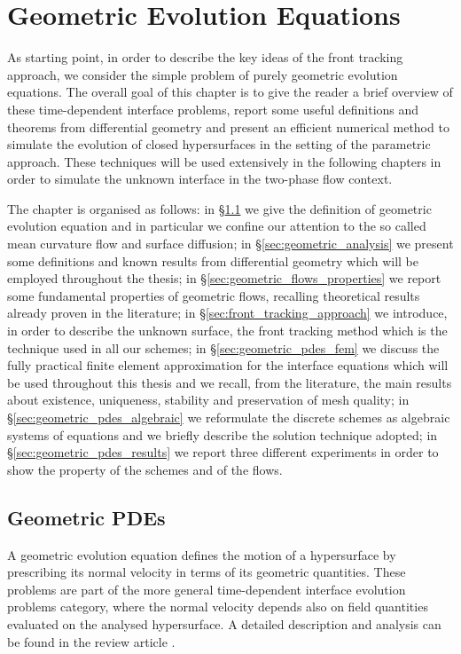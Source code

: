 \chapter{\sc Geometric Evolution Equations}\label{ch:geometric_pdes}
As starting point, in order to describe the key ideas of the front tracking
approach, we consider the simple problem of purely geometric evolution
equations. The overall goal of this chapter is to give the reader a brief
overview of these time-dependent interface problems, report some useful
definitions and theorems from differential geometry and present an efficient
numerical method to simulate the evolution of closed hypersurfaces in the
setting of the parametric approach. These techniques will be used extensively
in the following chapters in order to simulate the unknown interface in the
two-phase flow context.

The chapter is organised as follows: in \S\ref{sec:geometric_pdes} we
give the definition of geometric evolution equation and in particular we
confine our attention to the so called mean curvature flow and surface
diffusion; in \S\ref{sec:geometric_analysis} we present some definitions
and known results from differential geometry which will be employed throughout
the thesis; in \S\ref{sec:geometric_flows_properties} we report some
fundamental properties of geometric flows, recalling theoretical results already
proven in the literature; in \S\ref{sec:front_tracking_approach} we
introduce, in order to describe the unknown surface, the front tracking method
which is the technique used in all our schemes; in
\S\ref{sec:geometric_pdes_fem} we discuss the fully practical finite
element approximation for the interface equations which will be used throughout
this thesis and we recall, from the literature, the main results about
existence, uniqueness, stability and preservation of mesh quality; in
\S\ref{sec:geometric_pdes_algebraic} we reformulate the discrete schemes
as algebraic systems of equations and we briefly describe the solution technique
adopted; in \S\ref{sec:geometric_pdes_results} we report three different
experiments in order to show the property of the schemes and of the flows.

\section{Geometric PDEs}\label{sec:geometric_pdes}
A geometric evolution equation defines the motion of a hypersurface
by prescribing its normal velocity in terms of its geometric quantities. These
problems are part of the more general time-dependent interface evolution
problems category, where the normal velocity depends also on field quantities
evaluated on the analysed hypersurface. A detailed description and analysis can
be found in the review article \cite{DeckelnickDE05}.

